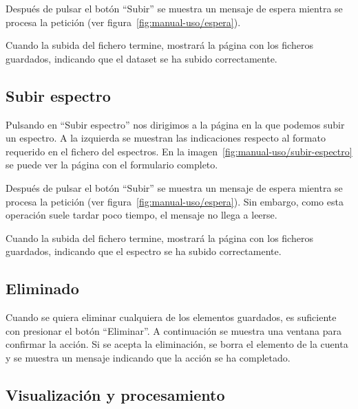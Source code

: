 
 Después de pulsar el botón ``Subir'' se muestra un mensaje 
de espera mientra se procesa la petición (ver 
figura~\ref{fig:manual-uso/espera}).


Cuando la subida del fichero termine, mostrará la página con los ficheros 
guardados, indicando que el dataset se ha subido correctamente.

\subsection{Subir espectro}

Pulsando en ``Subir espectro'' nos dirigimos a la página en la que podemos 
subir un espectro. A la izquierda se muestran las indicaciones respecto al 
formato requerido en el fichero del espectros. En la 
imagen~\ref{fig:manual-uso/subir-espectro} se puede ver la página con el 
formulario completo.


Después de pulsar el botón ``Subir'' se muestra un mensaje 
de espera mientra se procesa la petición (ver 
figura~\ref{fig:manual-uso/espera}). Sin embargo, como esta operación suele 
tardar poco tiempo, el mensaje no llega a leerse.


Cuando la subida del fichero termine, mostrará la página con los ficheros 
guardados, indicando que el espectro se ha subido correctamente.

\subsection{Eliminado}

Cuando se quiera eliminar cualquiera de los elementos guardados, es suficiente 
con presionar el botón ``Eliminar''. A continuación se muestra una ventana para 
confirmar la acción. Si se acepta la eliminación, se borra el elemento de la 
cuenta y se muestra un mensaje indicando que la acción se ha completado.

\subsection{Visualización y procesamiento}

